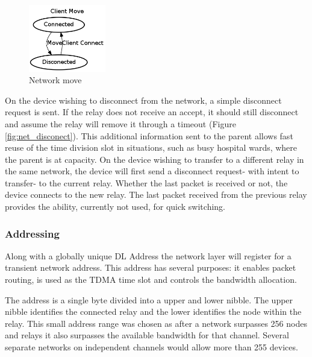 \begin{figure}
  \vspace{-10pt}
  \begin{center}
    \includegraphics[width=0.3\textwidth, keepaspectratio=true]{images/Network_Move.png}
  \end{center}
  \caption[Network Move]{Network move}
  \vspace{-10pt}
\end{figure}

On the device wishing to disconnect from the network, a simple disconnect request is sent. If the
relay does not receive an accept, it should still disconnect and assume the relay will remove it
through a timeout (Figure \ref{fig:net_disconect}). This additional information sent to the parent allows fast reuse of the
time division slot in situations, such as busy hospital wards, where the parent is at capacity.
On the device wishing to transfer to a different relay in the same network, the device will first send a
disconnect request- with intent to transfer- to the current relay. Whether the last packet is received
or not, the device connects to the new relay. The last packet received from the previous relay
provides the ability, currently not used, for quick switching.

\subsubsection{Addressing}
Along with a globally unique \ac{DL} Address the network layer will register for a transient network
address. This address has several purposes: it enables packet routing, is used as the \ac{TDMA} time slot
and controls the bandwidth allocation.


The address is a single byte divided into a upper and lower nibble. The upper nibble identifies the
connected relay and the lower identifies the node within the relay. This small address range was
chosen as after a network surpasses 256 nodes and relays it also surpasses the available bandwidth
for that channel. Several separate networks on independent channels would allow more than 255
devices.


